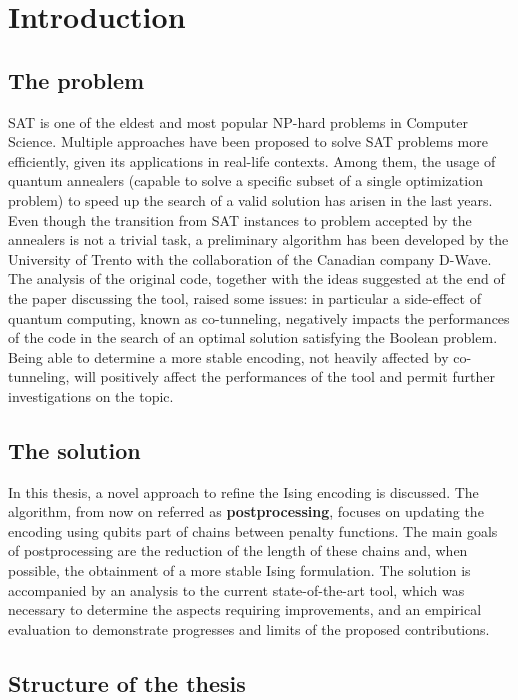 \chapter{Introduction}
\label{cha:intro}

\section{The problem}

SAT is one of the eldest and most popular NP-hard problems in Computer Science. Multiple approaches have been proposed to solve SAT problems more efficiently, given its applications in real-life contexts. Among them, the usage of quantum annealers (capable to solve a specific subset of a single optimization problem) to speed up the search of a valid solution has arisen in the last years. Even though the transition from SAT instances to problem accepted by the annealers is not a trivial task, a preliminary algorithm has been developed by the University of Trento with the collaboration of the Canadian company D-Wave. \\
The analysis of the original code, together with the ideas suggested at the end of the paper discussing the tool, raised some issues: in particular a side-effect of quantum computing, known as co-tunneling, negatively impacts the performances of the code in the search of an optimal solution satisfying the Boolean problem. Being able to determine a more stable encoding, not heavily affected by co-tunneling, will positively affect the performances of the tool and permit further investigations on the topic.


\section{The solution}

In this thesis, a novel approach to refine the Ising encoding is discussed. The algorithm, from now on referred as \textbf{postprocessing}, focuses on updating the encoding using qubits part of chains between penalty functions. The main goals of postprocessing are the reduction of the length of these chains and, when possible, the obtainment of a more stable Ising formulation. The solution is accompanied by an analysis to the current state-of-the-art tool, which was necessary to determine the aspects requiring improvements, and an empirical evaluation to demonstrate progresses and limits of the proposed contributions.

\section{Structure of the thesis}

